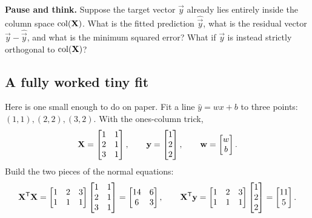 \begin{recoverybox}
\textbf{Pause and think.} Suppose the target vector $\vec{y}$ already lies entirely inside
the column space $\operatorname{col}(\mathbf{X})$. What is the fitted prediction $\hat{\vec{y}}$, what is the
residual vector $\vec{y}-\hat{\vec{y}}$, and what is the minimum squared error? What if $\vec{y}$
is instead strictly orthogonal to $\operatorname{col}(\mathbf{X})$?
\end{recoverybox}

\subsection{A fully worked tiny fit}

Here is one small enough to do on paper. Fit a line $\hat{y}=w x + b$ to
three points: $(1,1),(2,2),(3,2)$. With the ones-column trick,
\[
\mathbf{X}=\begin{bmatrix} 1 & 1 \\ 2 & 1 \\ 3 & 1 \end{bmatrix},
\qquad
\mathbf{y}=\begin{bmatrix} 1 \\ 2 \\ 2 \end{bmatrix},
\qquad
\mathbf{w}=\begin{bmatrix} w \\ b \end{bmatrix}.
\]
Build the two pieces of the normal equations:
\[
\mathbf{X}^{\mathsf{T}}\mathbf{X}=\begin{bmatrix} 1&2&3 \\ 1&1&1 \end{bmatrix}
\begin{bmatrix} 1&1 \\ 2&1 \\ 3&1 \end{bmatrix}
=\begin{bmatrix} 14 & 6 \\ 6 & 3 \end{bmatrix},
\qquad
\mathbf{X}^{\mathsf{T}}\mathbf{y}=\begin{bmatrix} 1&2&3 \\ 1&1&1 \end{bmatrix}
\begin{bmatrix} 1\\2\\2 \end{bmatrix}
=\begin{bmatrix} 11 \\ 5 \end{bmatrix}.
\]
